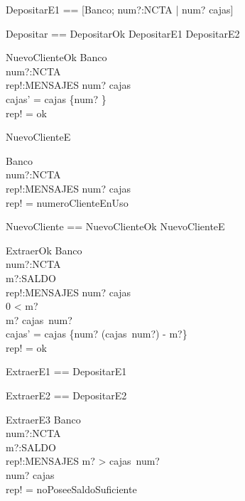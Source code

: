 \begin{zed}
DepositarE1 == [\Xi Banco; num?:NCTA | num? \notin \dom cajas]
\end{zed}


\begin{zed}
Depositar == DepositarOk \lor DepositarE1 \lor DepositarE2
\end{zed}

\begin{schema}{NuevoClienteOk}
\Delta Banco \\
num?:NCTA \\
rep!:MENSAJES
\where
num? \notin \dom cajas \\
cajas' = cajas \cup \{num? \} \\
rep! = ok
\end{schema}

\begin{schema}{NuevoClienteE}

\Xi Banco \\
num?:NCTA \\
rep!:MENSAJES
\where
num? \in \dom cajas \\
rep! = numeroClienteEnUso
\end{schema}

\begin{zed}
NuevoCliente == NuevoClienteOk \lor NuevoClienteE
\end{zed}

\begin{schema}{ExtraerOk}
\Delta Banco \\
num?:NCTA \\
m?:SALDO \\
rep!:MENSAJES
\where
num? \in \dom cajas \\
0 < m? \\
m? \leq cajas~num? \\
cajas' = cajas \oplus \{num? \mapsto (cajas~num?) - m?\} \\
rep! = ok
\end{schema}

\begin{zed}
ExtraerE1 == DepositarE1 \also

ExtraerE2 == DepositarE2
\end{zed}

\begin{schema}{ExtraerE3}
\Xi Banco \\
num?:NCTA \\
m?:SALDO \\
rep!:MENSAJES
\where
m? > cajas~num? \\
num? \in \dom cajas \\
rep! = noPoseeSaldoSuficiente
\end{schema}

